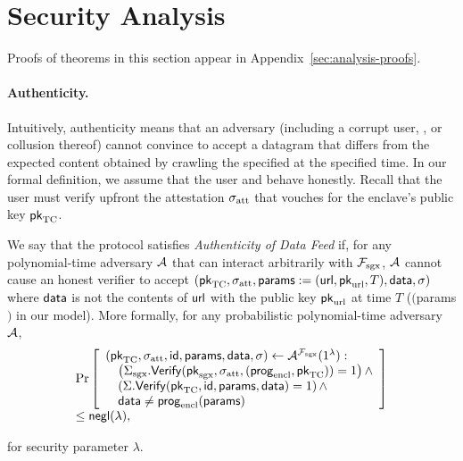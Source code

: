 \section{Security Analysis}
\label{sec:analysis}

Proofs of theorems in this section appear in Appendix~\ref{sec:analysis-proofs}.


\paragraph{Authenticity.}
Intuitively, authenticity means that an adversary (including a corrupt user, \medname, or collusion thereof)
cannot convince \tcont to accept a datagram that differs from the expected content obtained by crawling the specified \weburl at the specified time.
In our formal definition, we assume that the user and \tcont behave honestly.
Recall that the user must verify upfront the attestation ${\sigma_{\textrm{att}}}$ that vouches for the enclave's public key ${\sf pk}_{\textrm{TC}}$.

\begin{definition}
We say that the \tc protocol satisfies \emph{Authenticity of Data Feed} if,
for any polynomial-time adversary $\mathcal{A}$ that can interact arbitrarily with $\mathcal{F}_{\textrm{sgx}}$,
$\mathcal{A}$ cannot cause an honest verifier to accept $({\sf pk}_{\textrm{TC}}, {\sigma_{\textrm{att}}}, {\sf params}:=({{\sf url}}, {\sf pk}_{\textrm{url}}, T), {\sf data}, \sigma)$
where ${\sf data}$ is not the contents of ${{\sf url}}$ with the public key ${\sf pk}_{\textrm{url}}$ at time $T$ (\enclaveprog\hspace{-1mm}$(${\sf params}$)$ in our model).
More formally, for any probabilistic polynomial-time adversary $\mathcal{A}$,
\[
\begin{array}{l}
\Pr\left[
\begin{array}{l}
({\sf pk}_{\textrm{TC}}, {\sigma_{\textrm{att}}}, {\sf id}, {\sf params}, {\sf data}, \sigma) \leftarrow 
\mathcal{A}^{\mathcal{F}_{\textrm{sgx}}}(1^\lambda) :\\
\quad \left({\Sigma_{\textrm{sgx}}}.{\sf Verify}({\sf pk}_{\mathrm{sgx}}, {\sigma_{\textrm{att}}}, ({\sf prog}_{\textrm{encl}}, {\sf pk}_{\textrm{TC}})) = 1\right) \wedge \\
\quad \left(\Sigma.{\sf Verify}({\sf pk}_{\textrm{TC}}, {\sf id}, {\sf params}, {\sf data})  = 1\right) \wedge\\
\quad {\sf data} \neq {\sf prog}_{\textrm{encl}}({\sf params}) 
\end{array}
\right] \\[3pt] 
\leq {\sf negl}(\lambda),
\end{array}
\]
\label{defn:auth}


\vspace{-2mm}
\noindent for security parameter $\lambda$.
\end{definition}

